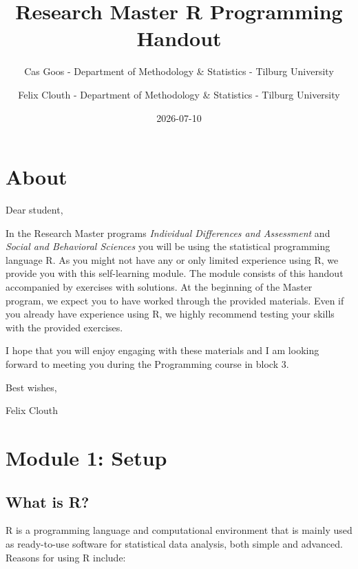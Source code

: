 \documentclass[
]{book}
\title{Research Master R Programming Handout}
\author{Cas Goos - Department of Methodology \& Statistics - Tilburg University \and Felix Clouth - Department of Methodology \& Statistics - Tilburg University}
\date{2026-07-10}
\begin{document}
\maketitle

{
\setcounter{tocdepth}{1}
\tableofcontents
}
\chapter{About}\label{about}

Dear student,

In the Research Master programs \emph{Individual Differences and Assessment} and \emph{Social and Behavioral Sciences} you will be using the statistical programming language R. As you might not have any or only limited experience using R, we provide you with this self-learning module. The module consists of this handout accompanied by exercises with solutions. At the beginning of the Master program, we expect you to have worked through the provided materials. Even if you already have experience using R, we highly recommend testing your skills with the provided exercises.

I hope that you will enjoy engaging with these materials and I am looking forward to meeting you during the Programming course in block 3.

Best wishes,

Felix Clouth

\chapter{Module 1: Setup}\label{module-1-setup}

\section{What is R?}\label{what-is-r}

R is a programming language and computational environment that is mainly used as ready-to-use software for statistical data analysis, both simple and advanced. Reasons for using R include:
\end{document}
